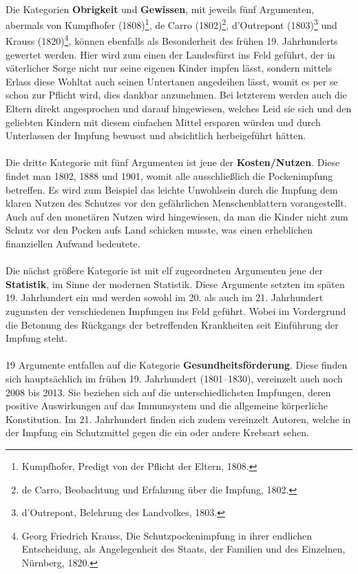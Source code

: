 \documentclass[
    a4paper,
    12pt,
    hyphens,
    chapterprefix=true,
    headheight=33pt,
    footheight=29pt,
    headings=optiontohead, %
]{scrartcl}
\begin{document}
{\\
Die Kategorien \textbf{Obrigkeit} und \textbf{Gewissen}, mit jeweils fünf Argumenten, abermals von Kumpfhofer (1808)\footnote{Kumpfhofer, Predigt von der Pflicht der Eltern, 1808.}, de Carro (1802)\footnote{de Carro, Beobachtung und Erfahrung über die Impfung, 1802.}, d'Outrepont (1803)\footnote{d'Outrepont, Belehrung des Landvolkes, 1803.} und Krauss (1820)\footnote{Georg Friedrich Krauss, Die Schutzpockenimpfung in ihrer endlichen Entscheidung, als Angelegenheit des Staats, der Familien und des Einzelnen, Nürnberg, 1820.}, können ebenfalls als Besonderheit des frühen 19. Jahrhunderts gewertet werden. Hier wird zum einen der Landesfürst ins Feld geführt, der in väterlicher Sorge nicht nur seine eigenen Kinder impfen lässt, sondern mittels Erlass diese Wohltat auch seinen Untertanen angedeihen lässt, womit es per se schon zur Pflicht wird, dies dankbar anzunehmen. Bei letzterem werden auch die Eltern direkt angesprochen und darauf hingewiesen, welches Leid sie sich und den geliebten Kindern mit diesem einfachen Mittel ersparen würden und durch Unterlassen der Impfung bewusst und absichtlich herbeigeführt hätten.\\
\\
Die dritte Kategorie mit fünf Argumenten ist jene der \textbf{Kosten/Nutzen}. Diese findet man 1802, 1888 und 1901, womit alle ausschließlich die Pockenimpfung betreffen. Es wird zum Beispiel das leichte Unwohlsein durch die Impfung dem klaren Nutzen des Schutzes vor den gefährlichen Menschenblattern vorangestellt. Auch auf den monetären Nutzen wird hingewiesen, da man die Kinder nicht zum Schutz vor den Pocken aufs Land schicken musste, was einen erheblichen finanziellen Aufwand bedeutete.\\
\\
Die nächst größere Kategorie ist mit elf zugeordneten Argumenten jene der \textbf{Statistik}, im Sinne der modernen Statistik. Diese Argumente setzten im späten 19. Jahrhundert ein und werden sowohl im 20. als auch im 21. Jahrhundert zugunsten der verschiedenen Impfungen ins Feld geführt. Wobei im Vordergrund die Betonung des Rückgangs der betreffenden Krankheiten seit Einführung der Impfung steht.\\
\\
19 Argumente entfallen auf die Kategorie \textbf{Gesundheitsförderung}. Diese finden sich hauptsächlich im frühen 19. Jahrhundert (1801--1830), vereinzelt auch noch 2008 bis 2013. Sie beziehen sich auf die unterschiedlichsten Impfungen, deren positive Auswirkungen auf das Immunsystem und die allgemeine körperliche Konstitution. Im 21. Jahrhundert finden sich zudem vereinzelt Autoren, welche in der Impfung ein Schutzmittel gegen die ein oder andere Krebsart sehen.\\
}
\end{document}
